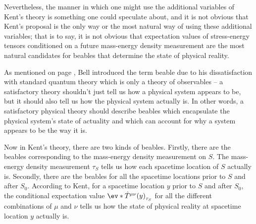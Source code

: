 \documentclass[12pt]{report}
\begin{document}
Nevertheless, the manner in which one might use the additional variables of Kent's theory is something one could speculate about, and it is not obvious that Kent's proposal is the only way or the most natural way of using these additional variables; that is to say, it is not obvious that expectation values of stress-energy tensors conditioned on a future mass-energy density measurement are the most natural candidates for beables that determine the state of physical reality.  

As mentioned on page \pageref{beabledef}, Bell introduced the term beable due to his dissatisfaction with standard quantum theory which is only a theory of observables -- a satisfactory theory shouldn't just tell us how a physical system appears to be, but it should also tell us how the physical system actually is. In other words, a satisfactory physical theory should describe beables which encapsulate the physical system's state of actuality and which can account for why a system appears to be the way it is. 

Now in Kent's theory, there are two kinds of beables. Firstly, there are the beables corresponding to the mass-energy density measurement on $S$. The mass-energy density measurement $\tau_S$ tells us how each spacetime location of $S$ actually is. Secondly, there are the beables for all the spacetime locations prior to $S$ and after $S_0$. According to Kent, for a spacetime location $y$ prior to $S$ and after $S_0$, the conditional expectation value  $\ev*{\hat{T}^{\mu\nu}(y)}_{\tau_S}$ for all the different combinations of $\mu$ and $\nu$ tells us how the state of physical reality at spacetime location $y$ actually is. 
\end{document}

